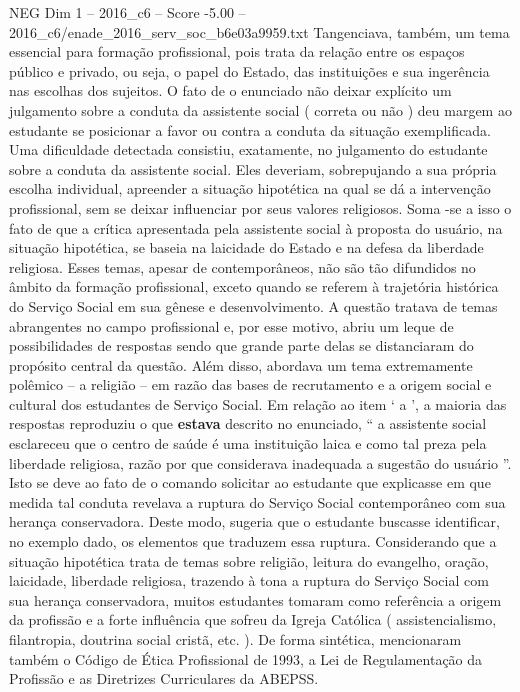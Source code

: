 \begin{textsample}{NEG Dim 1 – 2016\_c6 – Score -5.00 – 2016\_c6/enade\_2016\_serv\_soc\_b6e03a9959.txt}
Tangenciava, também, um tema essencial para formação profissional, pois trata da relação entre os espaços público e privado, ou seja, o papel do Estado, das instituições e sua ingerência nas escolhas dos sujeitos.
O fato de o enunciado não deixar explícito um julgamento sobre a conduta da assistente social ( correta ou não ) deu margem ao estudante se posicionar a favor ou contra a conduta da situação exemplificada.
Uma dificuldade detectada consistiu, exatamente, no julgamento do estudante sobre a conduta da assistente social.
Eles deveriam, sobrepujando a sua própria escolha individual, apreender a situação hipotética na qual se dá a intervenção profissional, sem se deixar influenciar por seus valores religiosos.
Soma -se a isso o fato de que a crítica apresentada pela assistente social à proposta do usuário, na situação hipotética, se baseia na laicidade do Estado e na defesa da liberdade religiosa.
Esses temas, apesar de contemporâneos, não são tão difundidos no âmbito da formação profissional, exceto quando se referem à trajetória histórica do Serviço Social em sua gênese e desenvolvimento.
A questão tratava de temas abrangentes no campo profissional e, por esse motivo, abriu um leque de possibilidades de respostas sendo que grande parte delas se distanciaram do propósito central da questão.
Além disso, abordava um tema extremamente polêmico – a religião – em razão das bases de recrutamento e a origem social e cultural dos estudantes de Serviço Social.
Em relação ao item ‘ a ’, a maioria das respostas reproduziu o que \textbf{estava} descrito no enunciado, “ a assistente social esclareceu que o centro de saúde é uma instituição laica e como tal preza pela liberdade religiosa, razão por que considerava inadequada a sugestão do usuário ”.
Isto se deve ao fato de o comando solicitar ao estudante que explicasse em que medida tal conduta revelava a ruptura do Serviço Social contemporâneo com sua herança conservadora.
Deste modo, sugeria que o estudante buscasse identificar, no exemplo dado, os elementos que traduzem essa ruptura.
Considerando que a situação hipotética trata de temas sobre religião, leitura do evangelho, oração, laicidade, liberdade religiosa, trazendo à tona a ruptura do Serviço Social com sua herança conservadora, muitos estudantes tomaram como referência a origem da profissão e a forte influência que sofreu da Igreja Católica ( assistencialismo, filantropia, doutrina social cristã, etc. ).
De forma sintética, mencionaram também o Código de Ética Profissional de 1993, a Lei de Regulamentação da Profissão e as Diretrizes Curriculares da ABEPSS.

\end{textsample}
